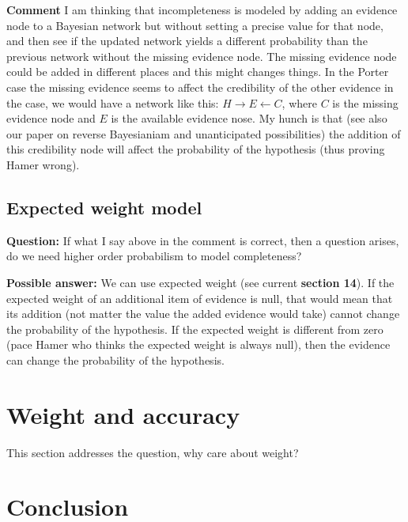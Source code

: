 \documentclass[
  10pt,
  dvipsnames,enabledeprecatedfontcommands]{scrartcl}
\begin{document}
\textbf{Comment} I am thinking that incompleteness is modeled by adding
an evidence node to a Bayesian network but without setting a precise
value for that node, and then see if the updated network yields a
different probability than the previous network without the missing
evidence node. The missing evidence node could be added in different
places and this might changes things. In the Porter case the missing
evidence seems to affect the credibility of the other evidence in the
case, we would have a network like this:
\(H\rightarrow E \leftarrow C\), where \(C\) is the missing evidence
node and \(E\) is the available evidence nose. My hunch is that (see
also our paper on reverse Bayesianiam and unanticipated possibilities)
the addition of this credibility node will affect the probability of the
hypothesis (thus proving Hamer wrong).

\hypertarget{expected-weight-model}{%
\subsection{Expected weight model}\label{expected-weight-model}}

\textbf{Question:} If what I say above in the comment is correct, then a
question arises, do we need higher order probabilism to model
completeness?

\textbf{Possible answer:} We can use expected weight (see current
\textbf{section 14}). If the expected weight of an additional item of
evidence is null, that would mean that its addition (not matter the
value the added evidence would take) cannot change the probability of
the hypothesis. If the expected weight is different from zero (pace
Hamer who thinks the expected weight is always null), then the evidence
can change the probability of the hypothesis.


\hypertarget{weight-and-accuracy}{%
\section{Weight and accuracy}\label{weight-and-accuracy}}

This section addresses the question, why care about weight?

\hypertarget{conclusion}{%
\section*{Conclusion}\label{conclusion}}
\end{document}
